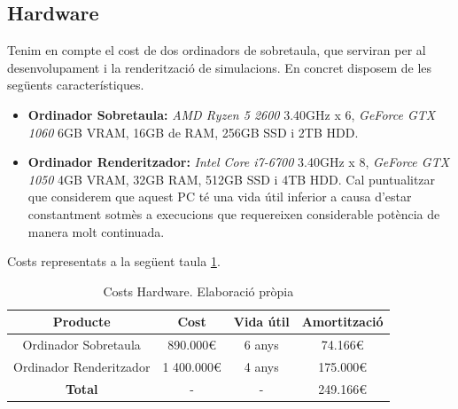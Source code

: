 \documentclass[a4paper]{report}
\begin{document}
	\subsection{Hardware}
	Tenim en compte el cost de dos ordinadors de sobretaula, que serviran per al desenvolupament i la renderització de simulacions. En concret disposem de les següents característiques.
	\begin{itemize}
		\item \textbf{Ordinador Sobretaula:} \textit{AMD Ryzen 5 2600} 3.40GHz x 6, \textit{GeForce GTX 1060} 6GB VRAM, 16GB de RAM, 256GB SSD i 2TB HDD.
		\item \textbf{Ordinador Renderitzador:} \textit{Intel Core i7-6700} 3.40GHz x 8, \textit{GeForce GTX 1050} 4GB VRAM, 32GB RAM, 512GB SSD i 4TB HDD. Cal puntualitzar que considerem que aquest PC té una vida útil inferior a causa d'estar constantment sotmès a execucions que requereixen considerable potència de manera molt continuada.
	\end{itemize}
	Costs representats a la següent taula \ref{table:hardwareCosts}.
	
	\begin{table}%
		\centering
		\begin{tabular}{|| c || c | c | c||}
			\hline
			\textbf{Producte} & \textbf{Cost} & \textbf{Vida útil} & \textbf{Amortització} \\
			\hline \hline
			Ordinador Sobretaula & 890.000\euro & 6 anys & 74.166\euro \\
			Ordinador Renderitzador & 1 400.000\euro & 4 anys & 175.000\euro \\
			\hline \hline
			\textbf{Total} & - & - & 249.166\euro \\
			\hline
		\end{tabular}
		\caption[Costs Hardware]{Costs Hardware. Elaboració pròpia}
		\label{table:hardwareCosts}
	\end{table}
\end{document}
